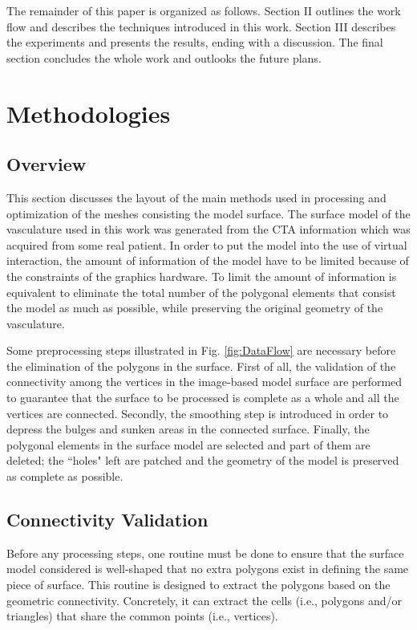 The remainder of this paper is organized as follows.
Section II outlines the work flow and describes the techniques introduced in this work.
Section III describes the experiments and presents the results, ending with a discussion.
The final section concludes the whole work and outlooks the future plans.

\section{Methodologies}

\subsection{Overview}

This section discusses the layout of the main methods used in processing and optimization of the meshes consisting the model surface.
The surface model of the vasculature used in this work was generated from the CTA information which was acquired from some real patient.
In order to put the model into the use of virtual interaction, the amount of information of the model have to be limited because of the constraints of the graphics hardware.
To limit the amount of information is equivalent to eliminate the total number of the polygonal elements that consist the model as much as possible, while preserving the original geometry of the vasculature. %

Some preprocessing steps illustrated in Fig. \ref{fig:DataFlow} are necessary before the elimination of the polygons in the surface.
First of all, the validation of the connectivity among the vertices in the image-based model surface are performed to guarantee that the surface to be processed is complete as a whole and all the vertices are connected. %
Secondly, the smoothing step is introduced in order to depress the bulges and sunken areas in the connected surface.
Finally, the polygonal elements in the surface model are selected and part of them are deleted; the ``holes" left are patched and the geometry of the model is preserved as complete as possible. %

\subsection{Connectivity Validation}

Before any processing steps, one routine must be done to ensure that the surface model considered is well-shaped that no extra polygons exist in defining the same piece of surface.
This routine is designed to extract the polygons based on the geometric connectivity.
Concretely, it can extract the cells (i.e., polygons and/or triangles) that share the common points (i.e., vertices).

